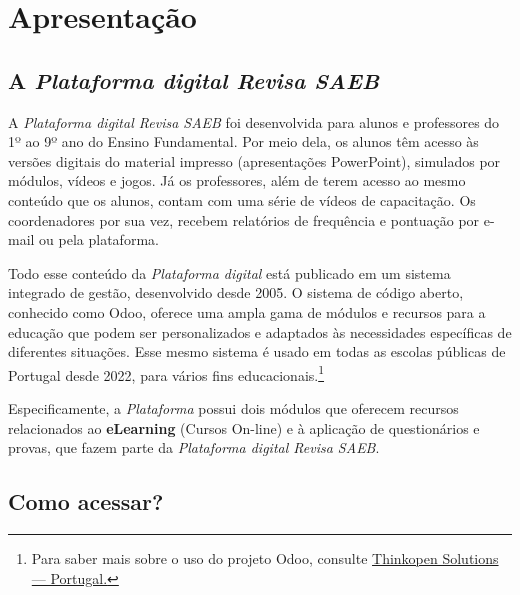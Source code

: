 \captionsetup{justification=raggedright, singlelinecheck=false}

\chapter{Apresentação}

\section{A \textit{Plataforma digital Revisa SAEB}}


A \textit{Plataforma digital Revisa SAEB} foi desenvolvida para alunos e
professores do 1º ao 9º ano do Ensino Fundamental. Por meio dela, os alunos
têm acesso às versões digitais do material impresso (apresentações PowerPoint), simulados 
por módulos, vídeos e jogos. Já os professores, além de terem acesso ao
mesmo conteúdo que os alunos, contam com uma série de vídeos de capacitação.
Os coordenadores por sua vez, recebem relatórios de frequência e pontuação por
e-mail ou pela plataforma.

Todo esse conteúdo da \textit{Plataforma digital} está publicado em um
sistema integrado de gestão, desenvolvido desde
2005. O sistema de código aberto, conhecido como Odoo, oferece uma ampla gama de módulos e
recursos para a educação que podem ser personalizados e adaptados às
necessidades específicas de diferentes situações. Esse mesmo sistema é usado
em todas as escolas públicas de Portugal desde 2022, para vários fins
educacionais.\footnote{ Para saber mais sobre o uso do projeto Odoo, consulte 
\href{https://www.odoo.com/pt_BR/partners/thinkopen-solutions-portugal-2614}{Thinkopen Solutions — Portugal.}}


Especificamente, a \textit{Plataforma} possui dois módulos que oferecem 
recursos relacionados ao \textbf{eLearning} (Cursos On-line) e 
à aplicação de questionários e provas, que fazem parte da \textit{Plataforma digital Revisa SAEB}.  




\section{Como acessar?} 

